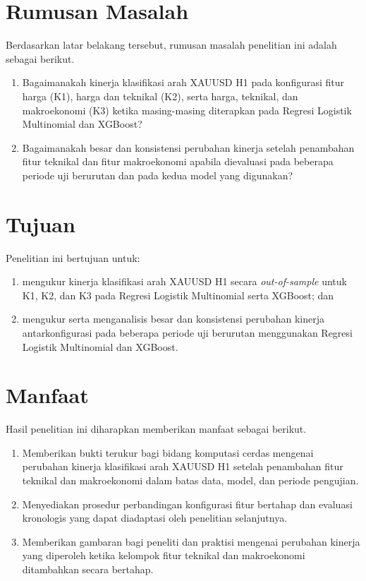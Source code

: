 \section{Rumusan Masalah}
Berdasarkan latar belakang tersebut, rumusan masalah penelitian ini adalah sebagai berikut.
\begin{enumerate}
    \item Bagaimanakah kinerja klasifikasi arah XAUUSD H1 pada konfigurasi fitur harga (K1), harga dan teknikal (K2), serta harga, teknikal, dan makroekonomi (K3) ketika masing-masing diterapkan pada Regresi Logistik Multinomial dan XGBoost?
    \item Bagaimanakah besar dan konsistensi perubahan kinerja setelah penambahan fitur teknikal dan fitur makroekonomi apabila dievaluasi pada beberapa periode uji berurutan dan pada kedua model yang digunakan?
\end{enumerate}

\section{Tujuan}
Penelitian ini bertujuan untuk:
\begin{enumerate}
    \item mengukur kinerja klasifikasi arah XAUUSD H1 secara \emph{out-of-sample} untuk K1, K2, dan K3 pada Regresi Logistik Multinomial serta XGBoost; dan
    \item mengukur serta menganalisis besar dan konsistensi perubahan kinerja antarkonfigurasi pada beberapa periode uji berurutan menggunakan Regresi Logistik Multinomial dan XGBoost.
\end{enumerate}

\section{Manfaat}
Hasil penelitian ini diharapkan memberikan manfaat sebagai berikut.
\begin{enumerate}
    \item Memberikan bukti terukur bagi bidang komputasi cerdas mengenai perubahan kinerja klasifikasi arah XAUUSD H1 setelah penambahan fitur teknikal dan makroekonomi dalam batas data, model, dan periode pengujian.
    \item Menyediakan prosedur perbandingan konfigurasi fitur bertahap dan evaluasi kronologis yang dapat diadaptasi oleh penelitian selanjutnya.
    \item Memberikan gambaran bagi peneliti dan praktisi mengenai perubahan kinerja yang diperoleh ketika kelompok fitur teknikal dan makroekonomi ditambahkan secara bertahap.
\end{enumerate}

